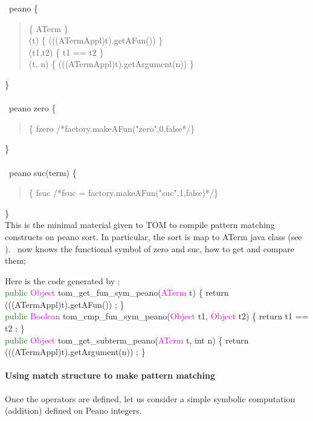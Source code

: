 \typeterm\ peano \{\\
\begin{quote}
 \implement           \{ ATerm \}\\
 \getfs(t)      \{ (((ATermAppl)t).getAFun()) \}\\
 \cmpfs(t1,t2)  \{ t1 == t2 \}\\
 \getsub(t, n)   \{ (((ATermAppl)t).getArgument(n)) \}\\
\end{quote}
\}\\
\\
\op\ peano zero \{\\
\begin{quote}
\fsym \{ fzero /*factory.makeAFun("zero",0,false*/\}\\
\end{quote}
\}\\
\\
\op\ peano suc(term) \{\\
\begin{quote}
  \fsym \{ fsuc /*fsuc  = factory.makeAFun("suc",1,false)*/\}\\
\end{quote}
\}\\

This is the minimal material given to TOM to compile pattern matching
constructs on peano sort. In particular, the sort is map to ATerm java class
(see \implement). \TOM\ now knows the functional symbol of zero and
suc, how to get and compare them;

Here is the code generated by \TOM:
\\ \textcolor{green}{public} \textcolor{magenta}{Object} \textsf{tom\_get\_fun\_sym\_peano}(\textcolor{magenta}{ATerm} t) \{ return  (((ATermAppl)t).getAFun()) ; \}
\\ \textcolor{green}{public} \textcolor{magenta}{Boolean} \textsf{tom\_cmp\_fun\_sym\_peano}(\textcolor{magenta}{Object} t1, \textcolor{magenta}{Object} t2) \{ return  t1 == t2 ; \}
\\ \textcolor{green}{public} \textcolor{magenta}{Object} \textsf{tom\_get\_subterm\_peano}(\textcolor{magenta}{ATerm} t, int n) \{ return
   (((ATermAppl)t).getArgument(n)) ; \}

\paragraph{Using match structure to make pattern matching}
Once the operators are defined, let us consider a simple symbolic
computation (addition) defined on Peano integers.

